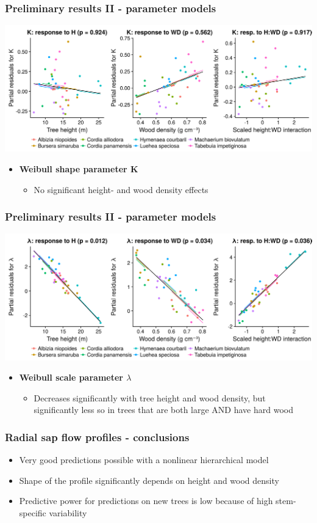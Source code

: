 \documentclass[usepdftitle=false]{beamer}
\newcommand{\Blue}[1]{{\color{blue!50!black}\textbf{#1}}}
\newcommand{\tw}{\textwidth}
\begin{document}
\begin{frame}
	\frametitle{Preliminary results II - parameter models}
		\includegraphics[width=\tw]{figures/HFD_03a_k_responses.png}
		\begin{itemize}
		\item \Blue{Weibull shape parameter K} 
			\begin{itemize}
				\item	No significant height- and wood density effects
			\end{itemize}
	\end{itemize}
\end{frame}

\begin{frame}
	\frametitle{Preliminary results II - parameter models}
	\includegraphics[width=\tw]{figures/HFD_03b_lambda_responses.png}
	\begin{itemize}
		\item \Blue{Weibull scale parameter $\lambda$}
		\begin{itemize}
			\item Decreases significantly with tree height and wood density, but significantly less so in trees that are both large AND have hard wood
		\end{itemize}	
	\end{itemize}
\end{frame}

\begin{frame}
	\frametitle{Radial sap flow profiles - conclusions}
	\begin{itemize}[<+-| alert@+>]
		\item Very good predictions possible with a nonlinear hierarchical model
		\item Shape of the profile significantly depends on height and wood density
		\item Predictive power for predictions on new trees is low because of high stem-specific variability
	\end{itemize}
\end{frame}
\end{document}
